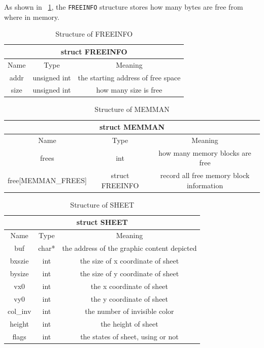 \documentclass{swfcthesis}
\begin{document}
As shown in ~\ref{tab:FREEINFO}, the \texttt{FREEINFO} structure stores how many bytes are
free from where in memory.

\begin{table}[!htbp]
  \centering
  \begin{tabular}[c]{|c|c|c|}
    \hline
    \multicolumn{3}{|c|}{struct FREEINFO} \\
    \hline
    Name & Type & Meaning \\
    \hline
    addr & unsigned int & the starting address of free space \\
    \hline
    size & unsigned int & how many size is free \\
    \hline
  \end{tabular}
  \caption{Structure of FREEINFO}
  \label{tab:FREEINFO}
\end{table}

\begin{table}[!htbp]
  \centering
  \begin{tabular}[c]{|c|c|c|}
    \hline
    \multicolumn{3}{|c|}{struct MEMMAN} \\
    \hline
    Name & Type & Meaning \\
    \hline
    frees & int & how many memory blocks are free \\
    \hline
    free[MEMMAN\_FREES] & struct FREEINFO & record all free memory block information \\
    \hline
    
  \end{tabular}
  \caption{Structure of MEMMAN}
  \label{tab:MEMMAN}
\end{table}

\begin{table}[!htbp]
  \centering
  \begin{tabular}{|c|c|c|}
    \hline
    \multicolumn{3}{|c|}{struct SHEET} \\
    \hline
    Name & Type & Meaning \\
    \hline
    buf & char* & the address of the graphic content depicted \\
    \hline
    bxszie & int & the size of x coordinate of sheet \\
    \hline
    bysize & int & the size of y coordinate of sheet \\
    \hline
    vx0 & int & the x coordinate of sheet \\
    \hline
    vy0 & int & the y coordinate of sheet \\
    \hline
    col\_inv & int & the number of invisible color \\
    \hline
    height & int & the height of sheet \\
    \hline
    flags & int & the states of sheet, using or not \\
    \hline
  \end{tabular}
  \caption{Structure of SHEET}
  \label{tab:SHEET}
\end{table}
\end{document}

